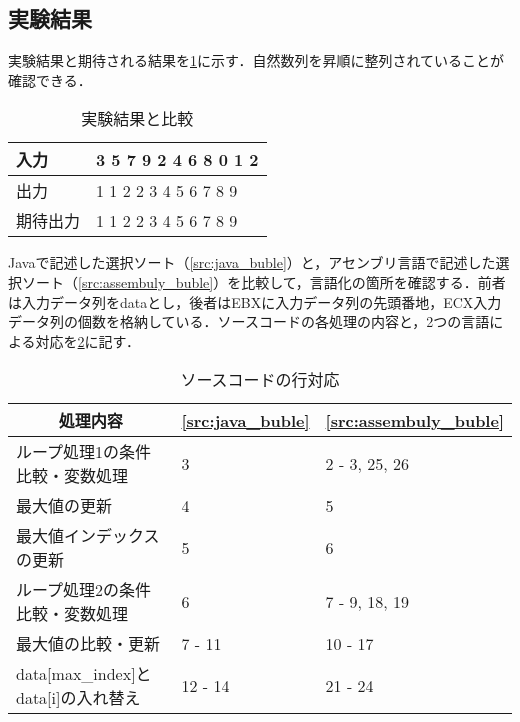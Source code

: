 \subsection{実験結果}
実験結果と期待される結果を\ref{tbl:execute}に示す．自然数列を昇順に整列されていることが確認できる．\par
\begin{table}[H]
   \centering
   \caption{実験結果と比較}
   \label{tbl:execute}
   \begin{tabular}{l|l}
       入力   & {\ttfamily 1 3 5 7 9 2 4 6 8 0 1 2} \\
       \hline
       出力   & {\ttfamily 0 1 1 2 2 3 4 5 6 7 8 9} \\
       期待出力 & {\ttfamily 0 1 1 2 2 3 4 5 6 7 8 9}
   \end{tabular}
\end{table}
{\ttfamily Java}で記述した選択ソート（\ref{src:java_buble}）と，アセンブリ言語で記述した選択ソート（\ref{src:assembuly_buble}）を比較して，言語化の箇所を確認する．前者は入力データ列を{\ttfamily data}とし，後者は{\ttfamily EBX}に入力データ列の先頭番地，{\ttfamily ECX}入力データ列の個数を格納している．ソースコードの各処理の内容と，2つの言語による対応を\ref{tbl:ソースコードの行対応}に記す．
\begin{table}[htbp]
   \centering
   \caption{ソースコードの行対応}
   \label{tbl:ソースコードの行対応}
   \begin{tabular}{p{10cm}p{2cm}p{2cm}}
       \multicolumn{1}{c}{処理内容}                              & \multicolumn{1}{c}{\ref{src:java_buble}} & \multicolumn{1}{c}{\ref{src:assembuly_buble}} \\
       \hline
       ループ処理1の条件比較・変数処理                                      & 3                                        & 2 - 3, 25, 26                                 \\
       最大値の更新                                                & 4                                        & 5                                             \\
       最大値インデックスの更新                                          & 5                                        & 6                                             \\
       ループ処理2の条件比較・変数処理                                      & 6                                        & 7 - 9, 18, 19                                 \\
       最大値の比較・更新                                             & 7 - 11                                   & 10 - 17                                       \\
       {\ttfamily data[max\_index]}と{\ttfamily data[i]}の入れ替え & 12 - 14                                  & 21 - 24                                       \\
       \hline
   \end{tabular}
\end{table}\\

